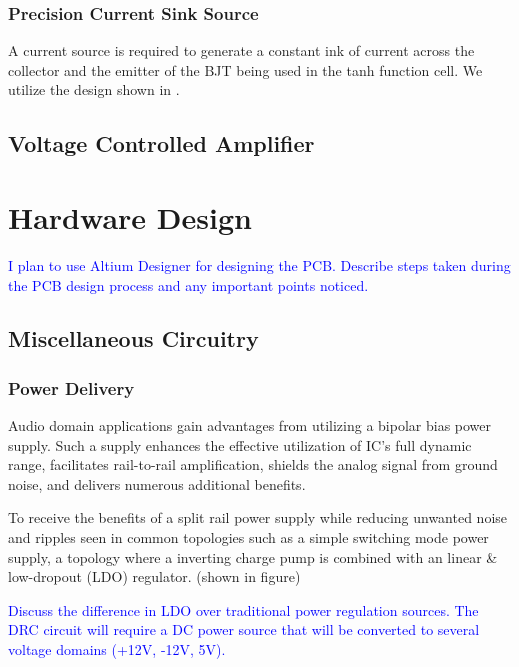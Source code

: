 \documentclass[10pt]{article}
\begin{document}
\begin{multicols*}{2}
\begin{minipage}{\linewidth}
                        \label{plot:tanh}
                    
                    \end{minipage}

                \subsubsection{Precision Current Sink Source}
                    A current source is required to generate a constant ink of current across the collector and the emitter of the BJT being used in the tanh function cell.
                    We utilize the design shown in \cite{ti-sink-source}.

            \subsection{Voltage Controlled Amplifier}

        \section{Hardware Design}
            \textcolor{blue}{I plan to use Altium Designer for designing the PCB. Describe steps taken during the PCB design process and any important points noticed.}

            \subsection{Miscellaneous Circuitry}

                \subsubsection{Power Delivery}
                    Audio domain applications gain advantages from utilizing a bipolar bias power supply. Such a supply enhances the effective utilization of IC's full dynamic range, facilitates rail-to-rail amplification, shields the analog signal from ground noise, and delivers numerous additional benefits. \cite{ti-3-v-rails}\par
                    To receive the benefits of a split rail power supply while reducing unwanted noise and ripples seen in common topologies such as a simple switching mode power supply, a topology where a inverting charge pump is combined with an linear \& low-dropout (LDO) regulator. (shown in figure)\par
                    \textcolor{blue}{Discuss the difference in LDO over traditional power regulation sources. The DRC circuit will require a DC power source that will be converted to several voltage domains (+12V, -12V, 5V).}
                    

\end{multicols*}
\end{document}
